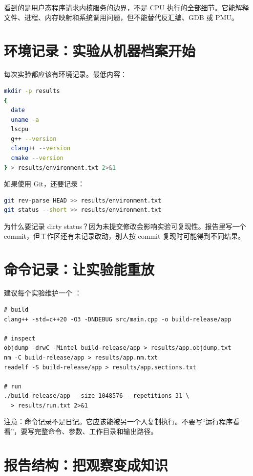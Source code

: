 \begin{warningbox}
 看到的是用户态程序请求内核服务的边界，不是 CPU 执行的全部细节。它能解释文件、进程、内存映射和系统调用问题，但不能替代反汇编、GDB 或 PMU。
\end{warningbox}

\section{环境记录：实验从机器档案开始}

每次实验都应该有环境记录。最低内容：

\begin{lstlisting}[language=bash]
mkdir -p results
{
  date
  uname -a
  lscpu
  g++ --version
  clang++ --version
  cmake --version
} > results/environment.txt 2>&1
\end{lstlisting}

如果使用 Git，还要记录：

\begin{lstlisting}[language=bash]
git rev-parse HEAD >> results/environment.txt
git status --short >> results/environment.txt
\end{lstlisting}

为什么要记录 dirty status？因为未提交修改会影响实验可复现性。报告里写一个 commit，但工作区还有未记录改动，别人按 commit 复现时可能得到不同结果。

\section{命令记录：让实验能重放}

建议每个实验维护一个 ：

\begin{lstlisting}
# build
clang++ -std=c++20 -O3 -DNDEBUG src/main.cpp -o build-release/app

# inspect
objdump -drwC -Mintel build-release/app > results/app.objdump.txt
nm -C build-release/app > results/app.nm.txt
readelf -S build-release/app > results/app.sections.txt

# run
./build-release/app --size 1048576 --repetitions 31 \
  > results/run.txt 2>&1
\end{lstlisting}

注意：命令记录不是日记。它应该能被另一个人复制执行。不要写“运行程序看看”，要写完整命令、参数、工作目录和输出路径。

\section{报告结构：把观察变成知识}

